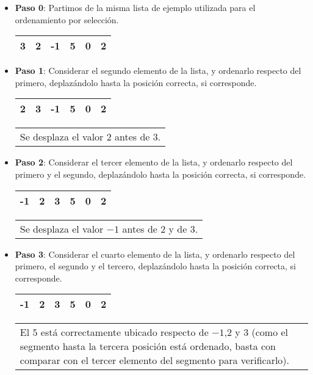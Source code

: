 \begin{itemize}

\item {\bf Paso 0}: Partimos de la misma lista de ejemplo utilizada para el ordenamiento
por selección. \\

\hspace{0.75cm}
\begin{tabular}[c]{|c|c|c|c|c|c|}
\hline
3& 2&-1&5&0&2\\
\hline
\end{tabular}
\hspace{0.75cm}

\item {\bf Paso 1}: Considerar el segundo elemento de la lista,
y ordenarlo respecto del primero, deplazándolo hasta la
posición correcta, si corresponde. \\

\hspace{0.75cm}
\begin{tabular}[c]{|c|c|c|c|c|c|}
\hline
2& 3&-1&5&0&2\\
\hline
\end{tabular}
\hspace{0.75cm}
\begin{tabular}{p{9cm}}
Se desplaza el valor $2$ antes de $3$.
\end{tabular}

\item {\bf Paso 2}: Considerar el tercer elemento de la lista,
y ordenarlo respecto del primero y el segundo, deplazándolo hasta la
posición correcta, si corresponde. \\

\hspace{0.75cm}
\begin{tabular}[c]{|c|c|c|c|c|c|}
\hline
-1& 2&3&5&0&2\\
\hline
\end{tabular}
\hspace{0.75cm}
\begin{tabular}{p{9cm}}
Se desplaza el valor $-1$ antes de $2$ y de $3$.
\end{tabular}

\item {\bf Paso 3}: Considerar el cuarto elemento de la lista,
y ordenarlo respecto del primero, el segundo y el tercero, deplazándolo hasta la
posición correcta, si corresponde. \\

\hspace{0.75cm}
\begin{tabular}[c]{|c|c|c|c|c|c|}
\hline
-1& 2&3&5&0&2\\
\hline
\end{tabular}
\hspace{0.75cm}
\begin{tabular}{p{9cm}}
El $5$ está correctamente ubicado respecto de $-1$,$2$ y $3$ (como el segmento
hasta la tercera posición está ordenado, basta con comparar con el tercer elemento del
segmento para verificarlo).\\
\end{tabular}


\end{itemize}
